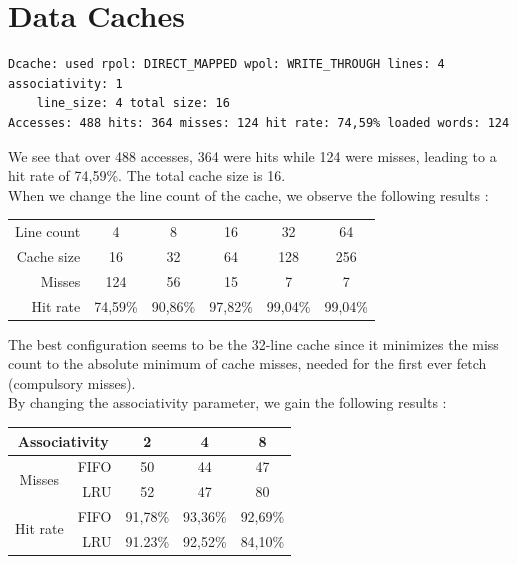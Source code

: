 \documentclass[a4paper]{report}
\begin{document}

\section{Data Caches}

\begin{verbatim}
Dcache: used rpol: DIRECT_MAPPED wpol: WRITE_THROUGH lines: 4 associativity: 1
    line_size: 4 total size: 16
Accesses: 488 hits: 364 misses: 124 hit rate: 74,59% loaded words: 124
\end{verbatim}

We see that over 488 accesses, 364 were hits while 124 were misses, leading to a hit rate of 74,59\%. The
total cache size is 16.
\mbox{}\\

When we change the line count of the cache, we observe the following results :

\begin{center}
	\begin{tabular}{|r||c|c|c|c|c|}
		\hline
		Line count & 4 & 8 & 16 & 32 & 64 \\
		Cache size & 16 & 32 & 64 & 128 & 256 \\
		Misses     & 124 & 56 & 15 & 7 & 7 \\
		Hit rate   & 74,59\% & 90,86\% & 97,82\% & 99,04\% & 99,04\% \\
		\hline
	\end{tabular}
\end{center}

The best configuration seems to be the 32-line cache since it minimizes the miss count to the absolute minimum
of cache misses, needed for the first ever fetch (compulsory misses).
\mbox{}\\

By changing the associativity parameter, we gain the following results :

\begin{center}
	\begin{tabular}{|c|r||c|c|c|}
		\hline
		\multicolumn{2}{|c||}{Associativity} & 2 & 4 & 8 \\
		\hline
		\multirow{2}{*}{Misses}   & FIFO  & 50 & 44 & 47 \\
		                          & LRU   & 52 & 47 & 80 \\
		\multirow{2}{*}{Hit rate} & FIFO  & 91,78\% & 93,36\% & 92,69\% \\
		                          & LRU   & 91.23\% & 92,52\% & 84,10\% \\
		\hline
	\end{tabular}
\end{center}
\end{document}

